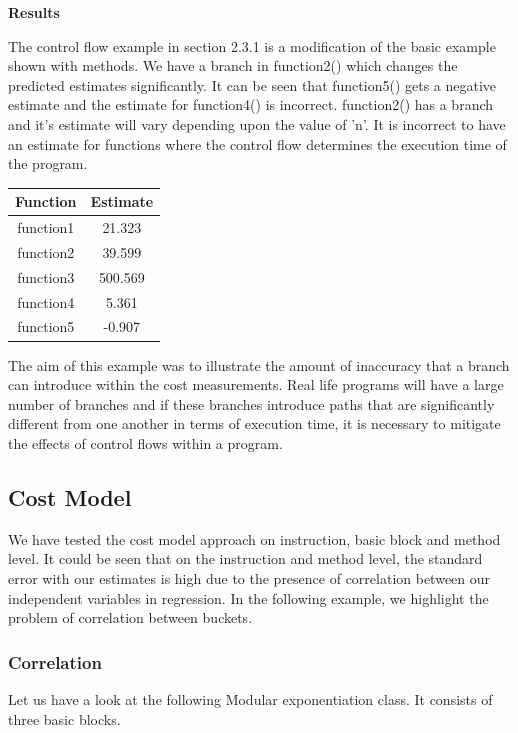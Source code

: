 \documentclass[11pt]{article}
\begin{document}
\textbf{Results}

The control flow example in section 2.3.1 is a modification of the basic example shown with methods. We have a branch in function2() which changes the predicted estimates significantly. It can be seen that function5() gets a negative estimate and the estimate for function4() is incorrect. function2() has a branch and it's estimate will vary depending upon the value of 'n'. It is incorrect to have an estimate for functions where the control flow determines the execution time of the program.\newline

\begin{center}
\begin{tabular}{|c|c|}
\hline
Function&Estimate\\
\hline
function1&21.323\\
function2&39.599\\
function3&500.569\\
function4&5.361\\
function5&-0.907\\
\hline
\end{tabular}
\end{center}

The aim of this example was to illustrate the amount of inaccuracy that a branch can introduce within the cost measurements. Real life programs will have a large number of branches and if these branches introduce paths that are significantly different from one another in terms of execution time, it is necessary to mitigate the effects of control flows within a program. \newline
\newpage

\subsection{Cost Model}
We have tested the cost model approach on instruction, basic block and method level. It could be seen that on the instruction and method level, the standard error with our estimates is high due to the presence of correlation between our independent variables in regression. In the following example, we highlight the problem of correlation between buckets.

\subsubsection{Correlation}

Let us have a look at the following Modular exponentiation class. It consists of three basic blocks.
\end{document}
